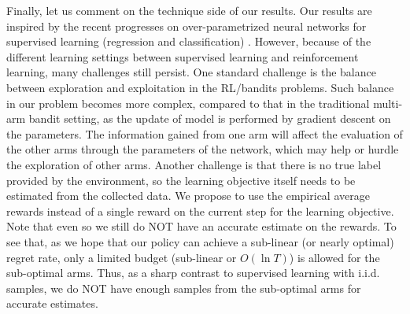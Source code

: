 Finally, let us comment on the technique side of our results. 
Our results are inspired by the recent progresses on over-parametrized neural networks for supervised learning (regression and classification) \citep{li2018learning,du2018gradientA,du2018gradientB,allen2018convergenceA,allen2018convergenceB}. 
However, because of the different learning settings between supervised learning and reinforcement learning, many challenges still persist. 
One standard challenge is the balance between exploration and exploitation in the RL/bandits problems.
Such balance in our problem becomes more complex, compared to that in the traditional multi-arm bandit setting, as the update of model is performed by gradient descent on the parameters.
The information gained from one arm will affect the evaluation of the other arms through the parameters of the network, which may help or hurdle the exploration of other arms.
Another challenge is that there is no true label provided by the environment, so the learning objective itself needs to be estimated from the collected data.
We propose to use the empirical average rewards instead of a single reward on the current step for the learning objective. 
Note that even so we still do NOT have an accurate estimate on the rewards.
To see that, as we hope that our policy can achieve a sub-linear (or nearly optimal) regret rate, only a limited budget (sub-linear or $O(\ln T )$) is allowed for the sub-optimal arms. Thus, as a sharp contrast to supervised learning with i.i.d. samples, we do NOT have enough samples from the sub-optimal arms for accurate estimates.  



